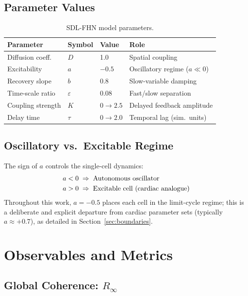 \documentclass[11pt,a4paper]{article}
\begin{document}
\subsection{Parameter Values}

\begin{table}[htbp]
\centering
\caption{SDL-FHN model parameters.}
\label{tab:params}
\begin{tabular}{@{}llll@{}}
\toprule
\textbf{Parameter} & \textbf{Symbol} & \textbf{Value} &
\textbf{Role} \\
\midrule
Diffusion coeff. & $D$ & 1.0 & Spatial coupling \\
Excitability & $a$ & $-0.5$ &
  Oscillatory regime ($a \ll 0$) \\
Recovery slope & $b$ & 0.8 & Slow-variable damping \\
Time-scale ratio & $\varepsilon$ & 0.08 &
  Fast/slow separation \\
Coupling strength & $K$ & $0 \to 2.5$ &
  Delayed feedback amplitude \\
Delay time & $\tau$ & $0 \to 2.0$ &
  Temporal lag (sim.\ units) \\
\bottomrule
\end{tabular}
\end{table}

\subsection{Oscillatory vs.\ Excitable Regime}

The sign of $a$ controls the single-cell dynamics:
\begin{align}
a < 0 &\;\Rightarrow\; \text{Autonomous oscillator} \notag\\
a > 0 &\;\Rightarrow\; \text{Excitable cell (cardiac analogue)}
\end{align}
Throughout this work, $a = -0.5$ places each cell in the
limit-cycle regime; this is a deliberate and explicit departure
from cardiac parameter sets (typically $a \approx +0.7$), as
detailed in Section~\ref{sec:boundaries}.

\section{Observables and Metrics}

\subsection{Global Coherence: $R_\infty$}
\end{document}
